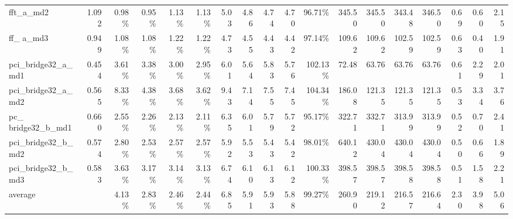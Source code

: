 \begin{table*}[t]
\begin{center}
\begin{tabular}{|l|r|rrrr|rrrrr|rrrr|rrr|}
   fft\_a\_md2	& 1.092	& 0.98\%	& 0.95\%	& 1.13\%	& 1.13\%	& 5.03	& 4.86	& 4.74	& 4.70	& 96.71\%	& 345.50	& 345.50	& 343.48	& 346.50	& 0.69	& 0.60	& 2.15\\
   ff\_ a\_md3	& 0.949	& 1.08\%	& 1.08\%	& 1.22\%	& 1.22\%	& 4.73	& 4.55	& 4.43	& 4.42	& 97.14\%	& 109.62	& 109.62	& 102.59	& 102.59	& 0.63	& 0.40	& 1.91\\
   pci\_bridge32\_a\_md1	& 0.454	& 3.61\%	& 3.38\%	& 3.00\%	& 2.95\%	& 6.01	& 5.64	& 5.83	& 5.76	& 102.13\%	& 72.48	& 63.76	& 63.76	& 63.76	& 0.61	& 2.29	& 2.01\\
   pci\_bridge32\_a\_md2	& 0.565	& 8.33\%	& 4.38\%	& 3.68\%	& 3.62\%	& 9.43	& 7.14	& 7.55	& 7.45	& 104.34\%	& 186.08	& 121.35	& 121.35	& 121.35	& 0.53	& 3.34	& 3.76\\
   pc\_ bridge32\_b\_md1	& 0.660	& 2.55\%	& 2.26\%	& 2.13\%	& 2.11\%	& 6.35	& 6.01	& 5.79	& 5.72	& 95.17\%	& 322.71	& 332.71	& 313.99	& 313.99	& 0.52	& 0.70	& 2.41\\
   pci\_bridge32\_b\_md2	& 0.574	& 2.80\%	& 2.53\%	& 2.57\%	& 2.57\%	& 5.92	& 5.53	& 5.43	& 5.42	& 98.01\%	& 640.12	& 430.04	& 430.04	& 430.04	& 0.50	& 0.66	& 1.89\\
   pci\_bridge32\_b\_md3	&0.583	& 3.63\%	& 3.17\%	& 3.14\%	& 3.13\%	& 6.74	& 6.10	& 6.13	& 6.12	& 100.33\%	& 398.57	& 398.57	& 398.58	& 398.58	& 0.51	& 1.58	& 2.21\\\midrule
   average	& 	& 4.13\%	& 2.83\%	& 2.46\%	& 2.44\%	& 6.85	& 5.91	& 5.93	& 5.88	& 99.27\%	& 260.90	& 219.12	& 216.57	& 216.64	& 2.30	& 3.98	&5.06\\\bottomrule
   \end{tabular}
    \end{center}
    \end{table*}